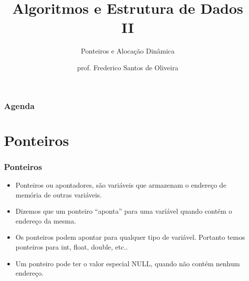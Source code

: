 \documentclass[aspectratio=169]{beamer}
\title[Ponteiros e Alocação Dinâmica]{Algoritmos e Estrutura de Dados II}
\subtitle{Ponteiros e Alocação Dinâmica}
\author[Frederico Santos de Oliveira]{prof. Frederico Santos de Oliveira}
\institute[UFMT]{Universidade Federal de Mato Grosso\\ Faculdade de Engenharia}
\date{}
\begin{document}
\begin{frame}[plain]
  \titlepage
\end{frame}


\begin{frame}
  \frametitle{Agenda}
  \tableofcontents
\end{frame}

\section{Ponteiros}

\begin{frame}
\frametitle{Ponteiros}
\begin{itemize}
\item Ponteiros ou apontadores, são variáveis que armazenam o endereço de memória de outras variáveis. 
\item Dizemos que um ponteiro ``aponta'' para uma varíável quando contém o endereço da mesma.
\item Os ponteiros podem apontar para qualquer tipo de variável. Portanto temos ponteiros para int, float, double, etc..
\item Um ponteiro pode ter o valor especial NULL, quando não contém nenhum endereço.
\end{itemize}
\end{frame}

\end{document}
